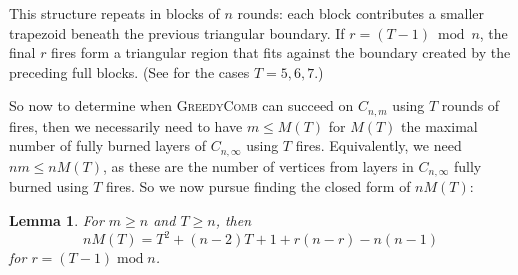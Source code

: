 \documentclass{article}
\def\pmod{\operatorname{mod}}
\newtheorem{lemma}{Lemma}
\begin{document}
This structure repeats in blocks of $n$ rounds: each block contributes a smaller trapezoid beneath the previous triangular boundary. If $r=(T-1)\bmod n$, the final $r$ fires form a triangular region that fits against the boundary created by the preceding full blocks. (See  for the cases $T=5,6,7$.)

So now to determine when \textsc{GreedyComb} can succeed on $C_{n,m}$ using $T$ rounds of fires, then we necessarily need to have $m \le M(T)$ for $M(T)$ the maximal number of fully burned layers of $C_{n,\infty}$ using $T$ fires. Equivalently, we need $nm \le n M(T)$, as these are the number of vertices from layers in $C_{n,\infty}$ fully burned using $T$ fires. So we now pursue finding the closed form of $n M(T)$:

\begin{lemma}
    For $m \ge n$ and $T \ge n$, then 
    \[
    nM(T) = T^2 + (n-2) T + 1 + r(n-r) - n(n-1)
    \]
    for $r = (T-1)\pmod n$.
\end{lemma}
\end{document}
